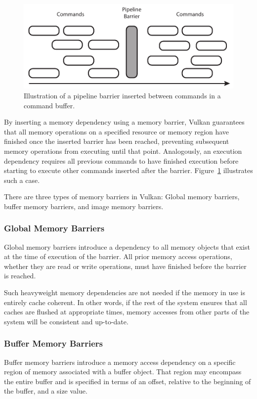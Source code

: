       \begin{figure}
        \centering
        \includegraphics[width=\textwidth]{Main/Images/PipelineBarrier}
        \caption{Illustration of a pipeline barrier inserted between commands in a command buffer.}
        \label{fig:PipelineBarrier}
      \end{figure}

      By inserting a memory dependency using a memory barrier, Vulkan guarantees that all memory operations on a specified resource or memory region have finished once the inserted barrier has been reached, preventing subsequent memory operations from executing until that point.
      Analogously, an execution dependency requires all previous commands to have finished execution before starting to execute other commands inserted after the barrier.
      Figure~\ref{fig:PipelineBarrier} illustrates such a case.

      There are three types of memory barriers in Vulkan: Global memory barriers, buffer memory barriers, and image memory barriers.

      \subsubsection{Global Memory Barriers}
        Global memory barriers introduce a dependency to all memory objects that exist at the time of execution of the barrier.
        All prior memory access operations, whether they are read or write operations, must have finished before the barrier is reached.

        Such heavyweight memory dependencies are not needed if the memory in use is entirely cache coherent.
        In other words, if the rest of the system ensures that all caches are flushed at appropriate times, memory accesses from other parts of the system will be consistent and up-to-date.

      \subsubsection{Buffer Memory Barriers}
        Buffer memory barriers introduce a memory access dependency on a specific region of memory associated with a buffer object.
        That region may encompass the entire buffer and is specified in terms of an offset, relative to the beginning of the buffer, and a size value.


